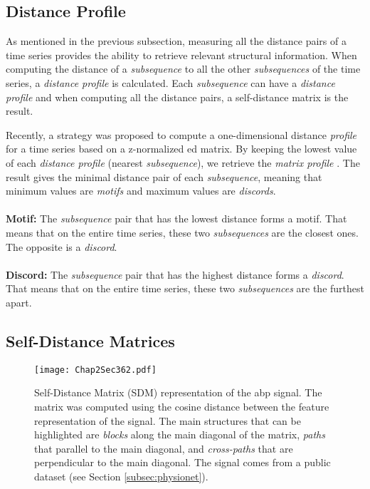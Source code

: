 \subsection{Distance Profile}
\label{subsec:matrixprofile}

As mentioned in the previous subsection, measuring all the distance pairs of a time series provides the ability to retrieve relevant structural information. When computing the distance of a \textit{subsequence} to all the other \textit{subsequences} of the time series, a \textit{distance profile} is calculated. Each \textit{subsequence} can have a \textit{distance profile} and when computing all the distance pairs, a self-distance matrix is the result.
\par
Recently, a strategy was proposed to compute a one-dimensional distance \textit{profile} for a time series based on a z-normalized \gls{ed} matrix. By keeping the lowest value of each \textit{distance profile} (nearest \textit{subsequence}), we retrieve the \textit{matrix profile} \cite{eamonn1}. The result gives the minimal distance pair of each \textit{subsequence}, meaning that minimum values are \textit{motifs} and maximum values are \textit{discords}.\\\\
\textbf{Motif:} The \textit{subsequence} pair that has the lowest distance forms a motif. That means that on the entire time series, these two \textit{subsequences} are the closest ones. The opposite is a \textit{discord}.\\\\
\textbf{Discord:} The \textit{subsequence} pair that has the highest distance forms a \textit{discord}. That means that on the entire time series, these two \textit{subsequences} are the furthest apart.\\

\subsection{Self-Distance Matrices}
\label{subsec:dist_matrix}

\begin{figure}
\centering
\texttt{[image: Chap2Sec362.pdf]}
\caption{Self-Distance Matrix (SDM) representation of the \gls{abp} signal. The matrix was computed using the cosine distance between the feature representation of the signal. The main structures that can be highlighted are \textit{blocks} along the main diagonal of the matrix, \textit{paths} that parallel to the main diagonal, and \textit{cross-paths} that are perpendicular to the main diagonal. The signal comes from a public dataset (see Section \ref{subsec:physionet}).}
\label{fig:ssm_pre}
\end{figure}

